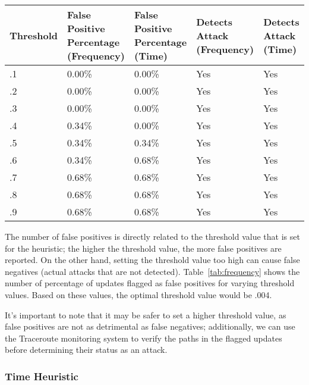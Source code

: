 \begin{table*}[h!]
\begin{center}
    \begin{tabular}{| p{2cm} | p{3cm} | p{3cm} | p{3cm} | p{2cm} |}
    \hline
    Threshold & False Positive 
Percentage (Frequency) & False Positive 
Percentage (Time) & Detects Attack 
(Frequency) & Detects Attack 
(Time)\\ \hline \hline
    .1 & 0.00\% & 0.00\% & Yes & Yes \\ \hline
    .2 & 0.00\% & 0.00\% & Yes & Yes \\ \hline
    .3 & 0.00\% & 0.00\% & Yes & Yes \\ \hline
    .4 & 0.34\% & 0.00\% & Yes & Yes \\ \hline
    .5 & 0.34\% & 0.34\% & Yes & Yes \\ \hline
    .6 & 0.34\% & 0.68\% & Yes & Yes \\ \hline
    .7 & 0.68\% & 0.68\% & Yes & Yes \\ \hline
    .8 & 0.68\% & 0.68\% & Yes & Yes \\ \hline
    .9 & 0.68\% & 0.68\% & Yes & Yes \\
    \hline
    \end{tabular}
\end{center}
\caption{The false positive rates for different thresholds used in the frequency heuristic.}
\label{tab:frequency}
\end{table*}

The number of false positives is directly related to the threshold value that is set for the heuristic; the higher the threshold value, the more false positives are reported.  On the other hand, setting the threshold value too high can cause false negatives (actual attacks that are not detected).  Table~\ref{tab:frequency} shows the number of percentage of updates flagged as false positives for varying threshold values.  Based on these values, the optimal threshold value would be .004.  

It's important to note that it may be safer to set a higher threshold value, as false positives are not as detrimental as false negatives; additionally, we can use the Traceroute monitoring system to verify the paths in the flagged updates before determining their status as an attack.  

\subsubsection{Time Heuristic}

